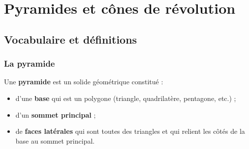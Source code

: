 \documentclass[a4paper]{book}
\begin{document}
\setcounter{chapter}{13} %
\renewcommand{\monTitre}{Pyramides et cônes de révolution}
\chapter{\monTitre}
\thispagestyle{fancy}

\section{Vocabulaire et définitions}

\subsection{La pyramide}
    \begin{definition}
        Une \textbf{pyramide} est un solide géométrique constitué :
        \begin{itemize}
            \item d'une \textbf{base} qui est un polygone (triangle, quadrilatère, pentagone, etc.) ;
            \item d'un \textbf{sommet principal} ;
            \item de \textbf{faces latérales} qui sont toutes des triangles et qui relient les côtés de la base au sommet principal.
        \end{itemize}
    \end{definition}
    
\end{document}
